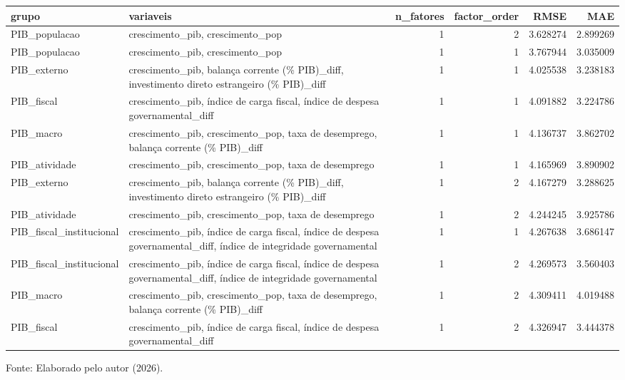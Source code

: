 \begin{table}[htbp]
	\begin{tabularx}{\textwidth}{>{\RaggedRight\arraybackslash}X>{\RaggedRight\arraybackslash}Xrrrr}
		\toprule
		grupo & variaveis & n\_fatores & factor\_order & RMSE & MAE \\
		\midrule
		PIB\_populacao & crescimento\_pib, crescimento\_pop & 1 & 2 & 3.628274 & 2.899269 \\
		PIB\_populacao & crescimento\_pib, crescimento\_pop & 1 & 1 & 3.767944 & 3.035009 \\
		PIB\_externo & crescimento\_pib, balança corrente (\% PIB)\_diff, investimento direto estrangeiro (\% PIB)\_diff & 1 & 1 & 4.025538 & 3.238183 \\
		PIB\_fiscal & crescimento\_pib, índice de carga fiscal, índice de despesa governamental\_diff & 1 & 1 & 4.091882 & 3.224786 \\
		PIB\_macro & crescimento\_pib, crescimento\_pop, taxa de desemprego, balança corrente (\% PIB)\_diff & 1 & 1 & 4.136737 & 3.862702 \\
		PIB\_atividade & crescimento\_pib, crescimento\_pop, taxa de desemprego & 1 & 1 & 4.165969 & 3.890902 \\
		PIB\_externo & crescimento\_pib, balança corrente (\% PIB)\_diff, investimento direto estrangeiro (\% PIB)\_diff & 1 & 2 & 4.167279 & 3.288625 \\
		PIB\_atividade & crescimento\_pib, crescimento\_pop, taxa de desemprego & 1 & 2 & 4.244245 & 3.925786 \\
		PIB\_fiscal\_institucional & crescimento\_pib, índice de carga fiscal, índice de despesa governamental\_diff, índice de integridade governamental & 1 & 1 & 4.267638 & 3.686147 \\
		PIB\_fiscal\_institucional & crescimento\_pib, índice de carga fiscal, índice de despesa governamental\_diff, índice de integridade governamental & 1 & 2 & 4.269573 & 3.560403 \\
		PIB\_macro & crescimento\_pib, crescimento\_pop, taxa de desemprego, balança corrente (\% PIB)\_diff & 1 & 2 & 4.309411 & 4.019488 \\
		PIB\_fiscal & crescimento\_pib, índice de carga fiscal, índice de despesa governamental\_diff & 1 & 2 & 4.326947 & 3.444378 \\
		\bottomrule
	\end{tabularx}
	
	
	\vspace{0.1cm}
	
	\small Fonte: Elaborado pelo autor (2026).
\end{table}




